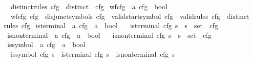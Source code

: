 \begin{isabellebody}
\ \ {\isachardoublequoteopen}distinct{\isacharunderscore}{\kern0pt}rules\ cfg\ {\isacharequal}{\kern0pt}\ distinct\ {\isacharparenleft}{\kern0pt}{\isasymRR}\ cfg{\isacharparenright}{\kern0pt}{\isachardoublequoteclose}\isanewline
\isanewline
{}\isamarkupfalse%
\ wf{\isacharunderscore}{\kern0pt}cfg\ {\isacharcolon}{\kern0pt}{\isacharcolon}{\kern0pt}\ {\isachardoublequoteopen}{\isacharprime}{\kern0pt}a\ cfg\ {\isasymRightarrow}\ bool{\isachardoublequoteclose}\ \isanewline
\ \ {\isachardoublequoteopen}wf{\isacharunderscore}{\kern0pt}cfg\ cfg\ {\isasymlongleftrightarrow}\ disjunct{\isacharunderscore}{\kern0pt}symbols\ cfg\ {\isasymand}\ valid{\isacharunderscore}{\kern0pt}startsymbol\ cfg\ {\isasymand}\ valid{\isacharunderscore}{\kern0pt}rules\ cfg\ {\isasymand}\ distinct{\isacharunderscore}{\kern0pt}rules\ cfg{\isachardoublequoteclose}\isanewline
\isanewline
\isanewline
\isanewline
{}\isamarkupfalse%
\ is{\isacharunderscore}{\kern0pt}terminal\ {\isacharcolon}{\kern0pt}{\isacharcolon}{\kern0pt}\ {\isachardoublequoteopen}{\isacharprime}{\kern0pt}a\ cfg\ {\isasymRightarrow}\ {\isacharprime}{\kern0pt}a\ {\isasymRightarrow}\ bool{\isachardoublequoteclose}\ \isanewline
\ \ {\isachardoublequoteopen}is{\isacharunderscore}{\kern0pt}terminal\ cfg\ s\ {\isacharequal}{\kern0pt}\ {\isacharparenleft}{\kern0pt}s\ {\isasymin}\ set\ {\isacharparenleft}{\kern0pt}{\isasymTT}\ cfg{\isacharparenright}{\kern0pt}{\isacharparenright}{\kern0pt}{\isachardoublequoteclose}\isanewline
\isanewline
{}\isamarkupfalse%
\ is{\isacharunderscore}{\kern0pt}nonterminal\ {\isacharcolon}{\kern0pt}{\isacharcolon}{\kern0pt}\ {\isachardoublequoteopen}{\isacharprime}{\kern0pt}a\ cfg\ {\isasymRightarrow}\ {\isacharprime}{\kern0pt}a\ {\isasymRightarrow}\ bool{\isachardoublequoteclose}\ \isanewline
\ \ {\isachardoublequoteopen}is{\isacharunderscore}{\kern0pt}nonterminal\ cfg\ s\ {\isacharequal}{\kern0pt}\ {\isacharparenleft}{\kern0pt}s\ {\isasymin}\ set\ {\isacharparenleft}{\kern0pt}{\isasymNN}\ cfg{\isacharparenright}{\kern0pt}{\isacharparenright}{\kern0pt}{\isachardoublequoteclose}\isanewline
\isanewline
{}\isamarkupfalse%
\ is{\isacharunderscore}{\kern0pt}symbol\ {\isacharcolon}{\kern0pt}{\isacharcolon}{\kern0pt}\ {\isachardoublequoteopen}{\isacharprime}{\kern0pt}a\ cfg\ {\isasymRightarrow}\ {\isacharprime}{\kern0pt}a\ {\isasymRightarrow}\ bool{\isachardoublequoteclose}\ \isanewline
\ \ {\isachardoublequoteopen}is{\isacharunderscore}{\kern0pt}symbol\ cfg\ s\ {\isasymlongleftrightarrow}\ is{\isacharunderscore}{\kern0pt}terminal\ cfg\ s\ {\isasymor}\ is{\isacharunderscore}{\kern0pt}nonterminal\ cfg\ s{\isachardoublequoteclose}\isanewline

\end{isabellebody}

